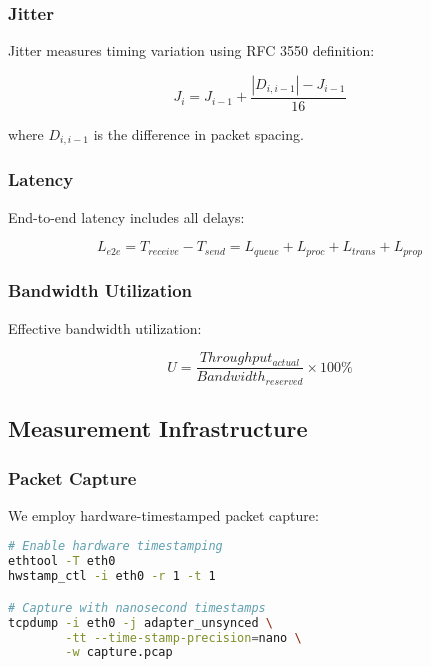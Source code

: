 \documentclass[10pt, journal, compsoc]{IEEEtran}
\begin{document}
\subsubsection{Jitter}

Jitter measures timing variation using RFC 3550 definition:

\begin{equation}
J_i = J_{i-1} + \frac{|D_{i,i-1}| - J_{i-1}}{16}
\end{equation}

where $D_{i,i-1}$ is the difference in packet spacing.

\subsubsection{Latency}

End-to-end latency includes all delays:

\begin{equation}
L_{e2e} = T_{receive} - T_{send} = L_{queue} + L_{proc} + L_{trans} + L_{prop}
\end{equation}

\subsubsection{Bandwidth Utilization}

Effective bandwidth utilization:

\begin{equation}
U = \frac{Throughput_{actual}}{Bandwidth_{reserved}} \times 100\%
\end{equation}

\subsection{Measurement Infrastructure}

\subsubsection{Packet Capture}

We employ hardware-timestamped packet capture:

\begin{lstlisting}[language=bash, caption=Packet Capture Setup]
# Enable hardware timestamping
ethtool -T eth0
hwstamp_ctl -i eth0 -r 1 -t 1

# Capture with nanosecond timestamps
tcpdump -i eth0 -j adapter_unsynced \
        -tt --time-stamp-precision=nano \
        -w capture.pcap
\end{lstlisting}
\end{document}
